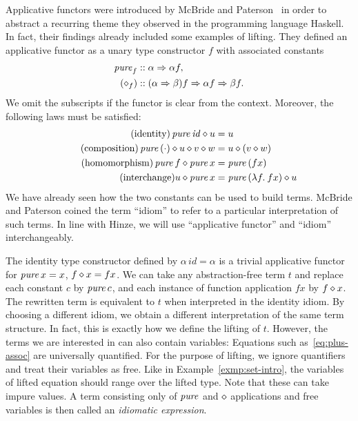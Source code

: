 Applicative functors were introduced by McBride and Paterson~\cite{mcbride08}
in order to abstract a recurring theme they observed in the programming language
Haskell.
In fact, their findings already included some examples of lifting.
They defined an applicative functor as a unary type constructor $f$ with
associated constants
\begin{align*}
	\operatorname{\mathit{pure}}_f &\mathrel{::} \alpha \Rightarrow \alpha f, \\
	(\diamond_f) &\mathrel{::} (\alpha \Rightarrow \beta) f \Rightarrow \alpha f \Rightarrow \beta f.
\end{align*}
We omit the subscripts if the functor is clear from the context.
Moreover, the following laws must be satisfied:
\begin{align*}
	\tag{identity} \operatorname{\mathit{pure}}{\mathit{id}} \diamond u &= u \\
	\tag{composition} \operatorname{\mathit{pure}}{(\cdot)} \diamond u \diamond v \diamond w &= u \diamond (v \diamond w) \\
	\tag{homomorphism} \operatorname{\mathit{pure}}{f} \diamond \operatorname{\mathit{pure}} x &= \operatorname{\mathit{pure}}{(f x)} \\
	\tag{interchange} u \diamond \operatorname{\mathit{pure}}{x} &= \operatorname{\mathit{pure}}{(\lambda f.\>f x)} \diamond u
\end{align*}
We have already seen how the two constants can be used to build terms.
McBride and Paterson coined the term ``idiom'' to refer to a particular
interpretation of such terms.
In line with Hinze, we will use ``applicative functor'' and ``idiom''
interchangeably.

The identity type constructor defined by $\alpha\,\mathit{id} = \alpha$ is a
trivial applicative functor for $\operatorname{\mathit{pure}}{x} = x$, $f \diamond x = f x$.
We can take any abstraction-free term $t$ and replace each constant $c$ by
$\operatorname{\mathit{pure}}{c}$, and each instance of function application $f x$ by $f \diamond x$.
The rewritten term is equivalent to $t$ when interpreted in the identity idiom.
By choosing a different idiom, we obtain a different interpretation of the same
term structure.
In fact, this is exactly how we define the lifting of $t$.
However, the terms we are interested in can also contain variables:
Equations such as~\eqref{eq:plus-assoc} are universally quantified.
For the purpose of lifting, we ignore quantifiers and treat their variables
as free.
Like in Example~\ref{exmp:set-intro}, the variables of lifted equation should
range over the lifted type.
Note that these can take impure values.
A term consisting only of $\operatorname{\mathit{pure}}$ and $\diamond$ applications and free variables is
then called an \emph{idiomatic expression}.

